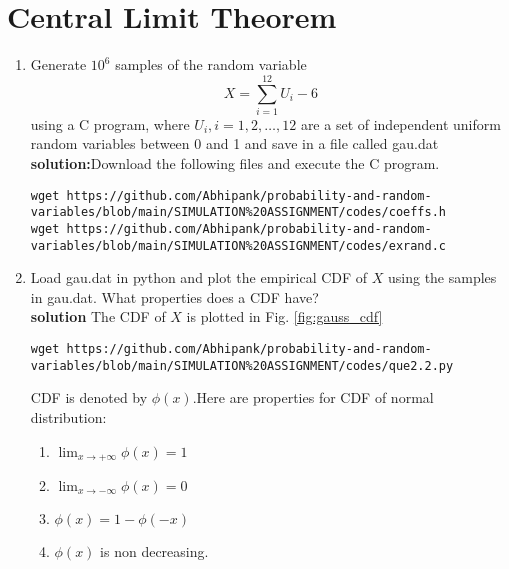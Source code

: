 \documentclass[journal,12pt,twocolumn]{IEEEtran}
\renewcommand\thesection{\arabic{section}}
\begin{document}
\section{Central Limit Theorem}
%
\begin{enumerate}[label=\thesection.\arabic*
,ref=\thesection.\theenumi]
%
\item
Generate $10^6$ samples of the random variable
%
\begin{equation}
X = \sum_{i=1}^{12}U_i -6
\end{equation}
%
using a C program, where $U_i, i = 1,2,\dots, 12$ are  a set of independent uniform random variables between 0 and 1
and save in a file called gau.dat\\
\textbf{solution:}Download the following files and execute the  C program.
\begin{lstlisting}
wget https://github.com/Abhipank/probability-and-random-variables/blob/main/SIMULATION%20ASSIGNMENT/codes/coeffs.h
wget https://github.com/Abhipank/probability-and-random-variables/blob/main/SIMULATION%20ASSIGNMENT/codes/exrand.c
\end{lstlisting}


%
\item
Load gau.dat in python and plot the empirical CDF of $X$ using the samples in gau.dat. What properties does a CDF have?
\\
\textbf{solution} The CDF of $X$ is plotted in Fig. \ref{fig:gauss_cdf}
\begin{lstlisting}
wget https://github.com/Abhipank/probability-and-random-variables/blob/main/SIMULATION%20ASSIGNMENT/codes/que2.2.py
\end{lstlisting}
CDF is denoted by $\phi(x)$.Here are  properties for CDF of normal distribution:
\begin{enumerate}
\item
    $\lim_{x \to +\infty} \phi(x)=1$
\item
    $\lim_{x \to -\infty} \phi(x)=0$
\item
    $\phi(x)=1-\phi(-x)$
\item
    $\phi(x)$ is non decreasing.
\end{enumerate}


\end{enumerate}
\end{document}
